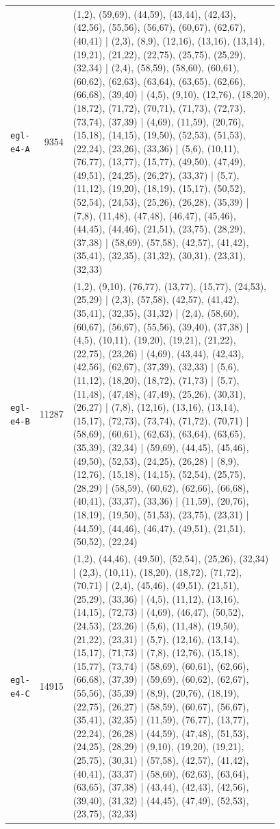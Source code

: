 \begin{landscape}
\begin{longtable}{lr>{\tiny\raggedright\arraybackslash}p{0.78\linewidth}}
\texttt{egl-e4-A} & 9354 & (1,2), (59,69), (44,59), (43,44), (42,43), (42,56), (55,56), (56,67), (60,67), (62,67), (40,41) | (2,3), (8,9), (12,16), (13,16), (13,14), (19,21), (21,22), (22,75), (25,75), (25,29), (32,34) | (2,4), (58,59), (58,60), (60,61), (60,62), (62,63), (63,64), (63,65), (62,66), (66,68), (39,40) | (4,5), (9,10), (12,76), (18,20), (18,72), (71,72), (70,71), (71,73), (72,73), (73,74), (37,39) | (4,69), (11,59), (20,76), (15,18), (14,15), (19,50), (52,53), (51,53), (22,24), (23,26), (33,36) | (5,6), (10,11), (76,77), (13,77), (15,77), (49,50), (47,49), (49,51), (24,25), (26,27), (33,37) | (5,7), (11,12), (19,20), (18,19), (15,17), (50,52), (52,54), (24,53), (25,26), (26,28), (35,39) | (7,8), (11,48), (47,48), (46,47), (45,46), (44,45), (44,46), (21,51), (23,75), (28,29), (37,38) | (58,69), (57,58), (42,57), (41,42), (35,41), (32,35), (31,32), (30,31), (23,31), (32,33) \\[2pt]
\texttt{egl-e4-B} & 11287 & (1,2), (9,10), (76,77), (13,77), (15,77), (24,53), (25,29) | (2,3), (57,58), (42,57), (41,42), (35,41), (32,35), (31,32) | (2,4), (58,60), (60,67), (56,67), (55,56), (39,40), (37,38) | (4,5), (10,11), (19,20), (19,21), (21,22), (22,75), (23,26) | (4,69), (43,44), (42,43), (42,56), (62,67), (37,39), (32,33) | (5,6), (11,12), (18,20), (18,72), (71,73) | (5,7), (11,48), (47,48), (47,49), (25,26), (30,31), (26,27) | (7,8), (12,16), (13,16), (13,14), (15,17), (72,73), (73,74), (71,72), (70,71) | (58,69), (60,61), (62,63), (63,64), (63,65), (35,39), (32,34) | (59,69), (44,45), (45,46), (49,50), (52,53), (24,25), (26,28) | (8,9), (12,76), (15,18), (14,15), (52,54), (25,75), (28,29) | (58,59), (60,62), (62,66), (66,68), (40,41), (33,37), (33,36) | (11,59), (20,76), (18,19), (19,50), (51,53), (23,75), (23,31) | (44,59), (44,46), (46,47), (49,51), (21,51), (50,52), (22,24) \\[2pt]
\texttt{egl-e4-C} & 14915 & (1,2), (44,46), (49,50), (52,54), (25,26), (32,34) | (2,3), (10,11), (18,20), (18,72), (71,72), (70,71) | (2,4), (45,46), (49,51), (21,51), (25,29), (33,36) | (4,5), (11,12), (13,16), (14,15), (72,73) | (4,69), (46,47), (50,52), (24,53), (23,26) | (5,6), (11,48), (19,50), (21,22), (23,31) | (5,7), (12,16), (13,14), (15,17), (71,73) | (7,8), (12,76), (15,18), (15,77), (73,74) | (58,69), (60,61), (62,66), (66,68), (37,39) | (59,69), (60,62), (62,67), (55,56), (35,39) | (8,9), (20,76), (18,19), (22,75), (26,27) | (58,59), (60,67), (56,67), (35,41), (32,35) | (11,59), (76,77), (13,77), (22,24), (26,28) | (44,59), (47,48), (51,53), (24,25), (28,29) | (9,10), (19,20), (19,21), (25,75), (30,31) | (57,58), (42,57), (41,42), (40,41), (33,37) | (58,60), (62,63), (63,64), (63,65), (37,38) | (43,44), (42,43), (42,56), (39,40), (31,32) | (44,45), (47,49), (52,53), (23,75), (32,33) \\[2pt]

\end{longtable}
\end{landscape}
